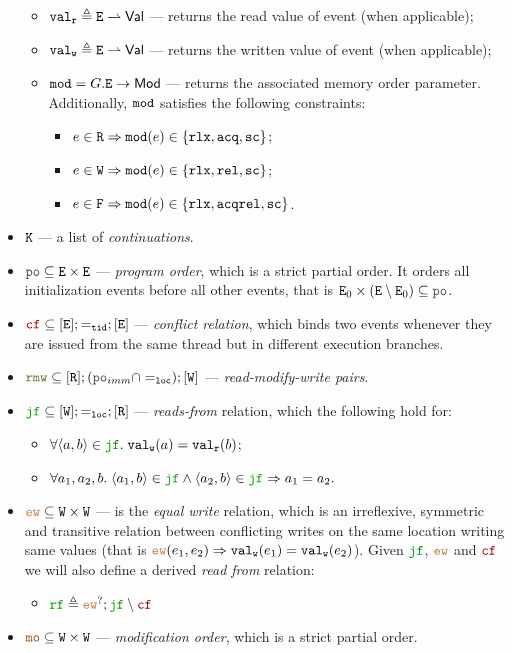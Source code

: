 \documentclass[12pt]{article}
\begin{document}
\begin{definition}
\begin{itemize}
\begin{itemize}
      \item ${\mathtt{val_r}} \triangleq {\mathtt{E}} \rightharpoonup \mathsf{Val}$ --- returns the read value of event (when applicable);
      \item ${\mathtt{val_w}} \triangleq {\mathtt{E}} \rightharpoonup \mathsf{Val}$ --- returns the written value of event
        (when applicable);
      \item ${\mathtt{mod}} = G.{\mathtt{E}} \rightarrow \mathsf{Mod}$ --- returns the associated memory order parameter.
        Additionally, ${\mathtt{mod}}$ satisfies the following constraints:
        \begin{itemize}
        \item $e \in {\mathtt{R}} \Rightarrow {\mathtt{mod}}(e) \in \{ \mathtt{rlx}, {\mathtt{acq}}, {\mathtt{sc}} \}$;
        \item $e \in {\mathtt{W}} \Rightarrow {\mathtt{mod}}(e) \in \{ \mathtt{rlx}, {\mathtt{rel}}, {\mathtt{sc}} \}$;
        \item $e \in {\mathtt{F}} \Rightarrow {\mathtt{mod}}(e) \in \{ \mathtt{rlx}, {\mathtt{acqrel}}, {\mathtt{sc}} \}$.
        \end{itemize}
    \end{itemize}
  \item ${\mathtt{K}}$ --- a list of \emph{continuations}.
  \item $\lPO \subseteq \lE \times \lE$ --- \emph{program order},
    which is a strict partial order.
    It orders all initialization events before all other events,
    that is $\lEo \times (\lE \setminus \lEo) \subseteq \lPO$.
  \item $\lCF \subseteq [\lE];=_{\lTID};[\lE]$ --- \emph{conflict relation},
    which binds two events whenever they are issued from the same thread but
    in different execution branches.    
  \item $\lRMW \subseteq [\lR];(\lPO_{imm} \cap =_{\lLOC});[\lW]$ ---
    \emph{read-modify-write pairs}.
  \item $\lJF \subseteq [\lW];=_{\lLOC};[\lR]$ --- \emph{reads-from} relation, which the following
    hold for:
    \begin{itemize}
    \item $\forall{\tup{a, b}} \in \lJF. \; \lVALW(a) = \lVALR(b)$;
    \item $\forall{a_1, a_2, b}. \;
      \tup{a_1, b} \in \lJF \wedge \tup{a_2, b} \in \lJF \Rightarrow a_1 = a_2.$
    \end{itemize}
  \item $\lEW \subseteq \lW \times \lW$ --- is the \emph{equal write} relation, 
    which is an irreflexive, symmetric and transitive relation between conflicting writes on the
    same location writing same values 
    (that is $\lEW(e_1, e_2) \Rightarrow \lVALW(e_1) = \lVALW(e_2)$).
    Given $\lJF$, $\lEW$ and $\lCF$ we will also define a derived \emph{read from} relation:
    \begin{itemize}
      \item $\lRF \defeq \lEW^?;\lJF \setminus \lCF$
    \end{itemize}
  \item $\lMO \subseteq \lW \times \lW$ --- \emph{modification order},
    which is a strict partial order.
  \end{itemize}
\end{definition}
\end{document}
